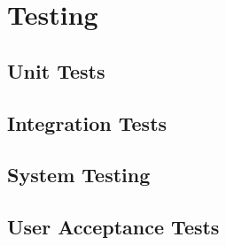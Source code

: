 \chapter{Testing}
\section{Unit Tests}
\section{Integration Tests}
\section{System Testing}
\section{User Acceptance Tests}

